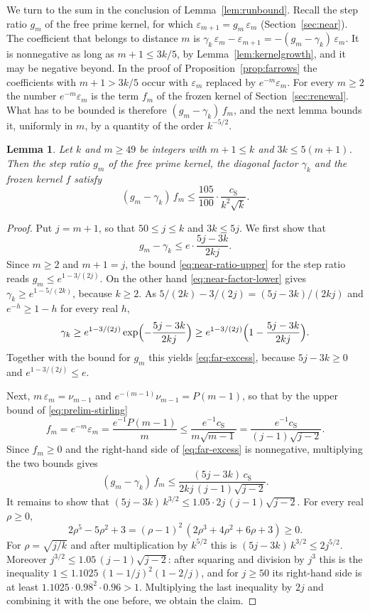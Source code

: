 \documentclass{amsart}
\newtheorem{lemma}[theorem]{Lemma}
\theoremstyle{definition}
\theoremstyle{remark}
\numberwithin{equation}{section}
\begin{document}
We turn to the sum in the conclusion of Lemma~\ref{lem:runbound}.
Recall the step ratio $g_m$ of the free prime kernel, for which
$\varepsilon_{m+1}=g_m\,\varepsilon_m$ (Section~\ref{sec:near}). The
coefficient that belongs to distance $m$ is
$\gamma_k\,\varepsilon_m-\varepsilon_{m+1}=-(g_m-\gamma_k)\,\varepsilon_m$.
It is nonnegative as long as $m+1\le3k/5$, by
Lemma~\ref{lem:kernelgrowth}, and it may be negative beyond. In the
proof of Proposition~\ref{prop:farrows} the coefficients with $m+1>3k/5$
occur with $\varepsilon_m$ replaced by $e^{-m}\varepsilon_m$. For every
$m\ge2$ the number $e^{-m}\varepsilon_m$ is the term $f_m$ of the frozen
kernel of Section~\ref{sec:renewal}. What has to be bounded
is therefore $(g_m-\gamma_k)\,f_m$, and the next lemma bounds it, uniformly
in $m$, by a quantity of the order $k^{-5/2}$.

\begin{lemma}\label{lem:farweights}
Let $k$ and $m\ge49$ be integers with $m+1\le k$ and $3k\le5(m+1)$. Then the
step ratio $g_m$ of the free prime kernel, the diagonal factor $\gamma_k$
and the frozen kernel $f$ satisfy
\[
(g_m-\gamma_k)\,f_m\le\frac{105}{100}\cdot\frac{c_{\mathrm S}}{k^2\sqrt k}.
\]
\end{lemma}

\begin{proof}
Put $j=m+1$, so that $50\le j\le k$ and $3k\le5j$. We first show that
\begin{equation}\label{eq:far-excess}
g_m-\gamma_k\le e\cdot\frac{5j-3k}{2kj}.
\end{equation}
Since $m\ge2$ and $m+1=j$, the bound \eqref{eq:near-ratio-upper} for the
step ratio reads $g_m\le e^{1-3/(2j)}$. On the other hand
\eqref{eq:near-factor-lower} gives $\gamma_k\ge e^{1-5/(2k)}$, because
$k\ge2$. As $5/(2k)-3/(2j)=(5j-3k)/(2kj)$ and
$e^{-h}\ge1-h$ for every real $h$,
\[
\gamma_k\ge e^{1-3/(2j)}\exp\Bigl(-\frac{5j-3k}{2kj}\Bigr)
\ge e^{1-3/(2j)}\Bigl(1-\frac{5j-3k}{2kj}\Bigr).
\]
Together with the bound for $g_m$ this yields \eqref{eq:far-excess}, because
$5j-3k\ge0$ and $e^{1-3/(2j)}\le e$.

Next, $m\,\varepsilon_m=\nu_{m-1}$ and $e^{-(m-1)}\nu_{m-1}=P(m-1)$, so that
by the upper bound of \eqref{eq:prelim-stirling}
\[
f_m=e^{-m}\varepsilon_m=\frac{e^{-1}P(m-1)}{m}
\le\frac{e^{-1}c_{\mathrm S}}{m\sqrt{m-1}}
=\frac{e^{-1}c_{\mathrm S}}{(j-1)\sqrt{j-2}} .
\]
Since $f_m\ge0$ and the right-hand side of \eqref{eq:far-excess} is
nonnegative, multiplying the two bounds gives
\[
(g_m-\gamma_k)\,f_m\le\frac{(5j-3k)\,c_{\mathrm S}}{2kj\,(j-1)\sqrt{j-2}} .
\]
It remains to show that
$(5j-3k)\,k^{3/2}\le1.05\cdot2j\,(j-1)\sqrt{j-2}$. For every real
$\rho\ge0$,
\[
2\rho^5-5\rho^2+3=(\rho-1)^2\,(2\rho^3+4\rho^2+6\rho+3)\ge0 .
\]
For $\rho=\sqrt{j/k}$ and after multiplication by $k^{5/2}$ this is
$(5j-3k)\,k^{3/2}\le2j^{5/2}$. Moreover
$j^{3/2}\le1.05\,(j-1)\sqrt{j-2}$: after squaring and division by
$j^3$ this is the inequality $1\le1.1025\,(1-1/j)^2(1-2/j)$, and for
$j\ge50$ its right-hand side is at least $1.1025\cdot0.98^2\cdot0.96>1$.
Multiplying the last inequality by $2j$ and combining it with the one before,
we obtain the claim.
\end{proof}
\end{document}
